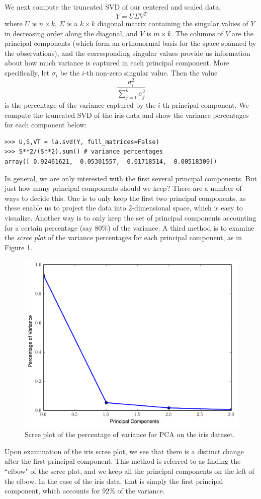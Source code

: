 We next compute the truncated SVD of our centered and scaled data,
\[Y = U\Sigma V^{T}\]
where $U$ is $n \times k$, $\Sigma$ is a $k\times k$ diagonal matrix containing the singular values of $Y$ in decreasing order along the diagonal, and $V$ is $m \times k$. The columns of $V$ are the principal components (which form an orthonormal basis for the space spanned by the observations), and the corresponding singular values provide us information about how much variance is captured in each principal component. More specifically, let $\sigma_{i}$ be the $i$-th non-zero singular value. Then the value
\[\frac{\sigma^2_{i}}{\sum_{j=1}^{k} \sigma^2_{j}}\]
is the percentage of the variance captured by the $i$-th principal component.
We compute the truncated SVD of the iris data and show the variance percentages for each component below:
\begin{lstlisting}
>>> U,S,VT = la.svd(Y, full_matrices=False)
>>> S**2/(S**2).sum() # variance percentages
array([ 0.92461621,  0.05301557,  0.01718514,  0.00518309])
\end{lstlisting}

In general, we are only interested with the first several principal components. But just how many principal components should we keep? There are a number of ways to decide this. One is to only keep the first two principal components, as these enable us to project the data into $2$-dimensional space, which is easy to visualize. Another way is to only keep the set of principal components accounting for a certain percentage (say $80\%$) of the variance. A third method is to examine the \emph{scree plot} of the variance percentages for each principal component, as in Figure \ref{fig:iris_scree}.
\begin{figure}
\includegraphics[width=\textwidth]{iris_scree.pdf}
\caption{Scree plot of the percentage of variance for PCA on the iris dataset.}
\label{fig:iris_scree}
\end{figure}
Upon examination of the iris scree plot, we see that there is a distinct change after the first principal component. This method is referred to as finding the ``elbow" of the scree plot, and we keep all the principal components on the left of the elbow. In the case of the iris data, that is simply the first principal component, which accounts for $92\%$ of the variance.

